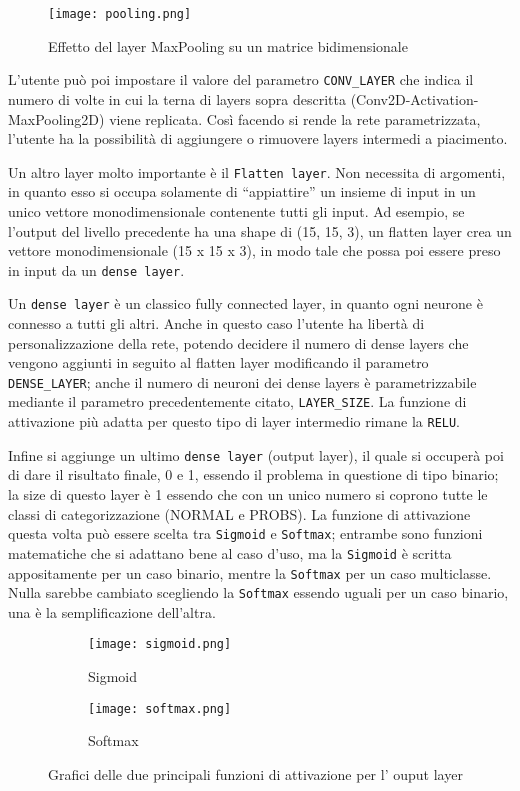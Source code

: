 \begin{figure}[H]
  \centering
  \texttt{[image: pooling.png]}
  \caption{Effetto del layer MaxPooling su un matrice bidimensionale}
\end{figure}

L’utente può poi impostare il valore del parametro \texttt{CONV\_LAYER} che indica il numero di volte in cui la terna di layers sopra descritta (Conv2D-Activation-MaxPooling2D) viene replicata. Così facendo si rende la rete parametrizzata, l’utente ha la possibilità di aggiungere o rimuovere layers intermedi a piacimento. 

Un altro layer molto importante è il \texttt{Flatten layer}. Non necessita di argomenti, in quanto esso si occupa solamente di “appiattire” un insieme di input in un unico vettore monodimensionale contenente tutti gli input. Ad esempio, se l’output del livello precedente ha una shape di (15, 15, 3), un flatten layer crea un vettore monodimensionale (15 x 15 x 3), in modo tale che possa poi essere preso in input da un \texttt{dense layer}. 

Un \texttt{dense layer} è un classico fully connected layer, in quanto ogni neurone è connesso a tutti gli altri. Anche in questo caso l’utente ha libertà di personalizzazione della rete, potendo decidere il numero di dense layers che vengono aggiunti in seguito al flatten layer modificando il parametro \texttt{DENSE\_LAYER}; anche il numero di neuroni dei dense layers è parametrizzabile mediante il parametro precedentemente citato, \texttt{LAYER\_SIZE}. La funzione di attivazione più adatta per questo tipo di layer intermedio rimane la \texttt{RELU}. 

Infine si aggiunge un ultimo \texttt{dense layer} (output layer), il quale si occuperà poi di dare il risultato finale, 0 e 1, essendo il problema in questione di tipo binario; la size di questo layer è 1 essendo che con un unico numero si coprono tutte le classi di categorizzazione (NORMAL e PROBS). La funzione di attivazione questa volta può essere scelta tra \texttt{Sigmoid} e \texttt{Softmax}; entrambe sono funzioni matematiche che si adattano bene al caso d’uso, ma la \texttt{Sigmoid} è scritta appositamente per un caso binario, mentre la \texttt{Softmax} per un caso multiclasse. Nulla sarebbe cambiato scegliendo la \texttt{Softmax} essendo uguali per un caso binario, una è la semplificazione dell’altra. 

\begin{figure}
  \centering
  \begin{subfigure}[b]{0.4\textwidth}
    \centering
    \texttt{[image: sigmoid.png]}
    \caption{Sigmoid}    
  \end{subfigure}
  \hfill
  \begin{subfigure}[b]{0.4\textwidth}
    \centering
    \texttt{[image: softmax.png]}
    \caption{Softmax}       
  \end{subfigure}
  \caption{Grafici delle due principali funzioni di attivazione per l' ouput layer}
\end{figure}

